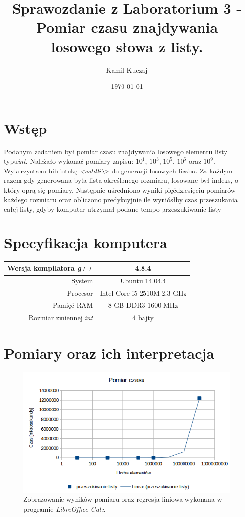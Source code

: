 \documentclass[11pt,a4paper]{article}
\author{Kamil Kuczaj}
\title{Sprawozdanie z Laboratorium 3 - Pomiar czasu znajdywania losowego słowa z listy.}
\date{\today}
\begin{document}
\maketitle

\section{Wstęp}
Podanym zadaniem był pomiar czasu znajdywania losowego elementu listy typu\textit{int}. Należało wykonać pomiary zapisu: $10^1$, $10^3$, $10^5$, $10^6$ oraz $10^9$. Wykorzystano bibliotekę \textit{<cstdlib>} do generacji losowych liczba. Za każdym razem gdy generowana była lista określonego rozmiaru, losowane był indeks, o który oprą się pomiary. Następnie uśredniono wyniki pięćdziesięciu pomiarów każdego rozmiaru oraz obliczono predykcyjnie ile wyniósłby czas przeszukania całej listy, gdyby komputer utrzymał podane tempo przeszukiwanie listy

\section{Specyfikacja komputera}

\begin{center}
	\begin{tabular}{| r | c |}
	\hline
	Wersja kompilatora \textit{g++} & 4.8.4 \\ \hline
	System & Ubuntu 14.04.4 \\ \hline
	Procesor	 & Intel Core i5 2510M 2.3 GHz \\ \hline
	Pamięć RAM & 8 GB DDR3 1600 MHz \\ \hline
	Rozmiar zmiennej \textit{int} & 4 bajty \\ \hline
	\end{tabular}
\end{center}

\section{Pomiary oraz ich interpretacja}

\begin{figure}[htbp]

\begin{center}
	\includegraphics[scale=0.6]{../wyniki/wyniki_przeszukania.png}
\end{center}
\caption{Zobrazowanie wyników pomiaru oraz regresja liniowa wykonana w programie \textit{LibreOffice Calc}.}
\end{figure}
\end{document}
